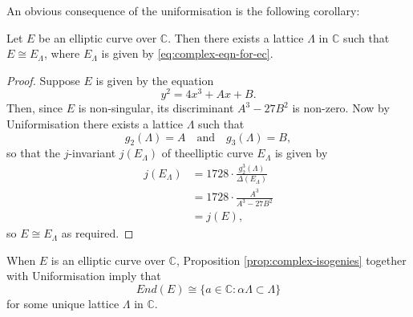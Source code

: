  An obvious consequence of the uniformisation is the following corollary:

 \begin{cor}
   \label{cor:uniformisation-corollary}
   Let $E$ be an elliptic curve over $\mathbb{C}$.  Then there exists a lattice
   $\Lambda$ in $\mathbb{C}$ such that $E \cong E_{\Lambda}$, where $E_{\Lambda}$ is
   given by \eqref{eq:complex-eqn-for-ec}.
 \end{cor}
 \begin{proof}
   Suppose $E$ is given by the equation
   \begin{equation*}
     y^{2} = 4x^{3} + Ax + B.
   \end{equation*}
   Then, since $E$ is non-singular, its discriminant $A^{3} - 27B^{2}$ is non-zero.
   Now by Uniformisation there exists a lattice $\Lambda$ such that
   \begin{equation*}
     g_{2}(\Lambda) = A \quad \text{and} \quad g_{3}(\Lambda) = B,
   \end{equation*}
   so that the $j$-invariant $j(E_{\Lambda})$ of theelliptic curve $E_{\Lambda}$ is
   given by
   \begin{align*}
     j(E_{\Lambda})&= 1728 \cdot \frac{g_{2}^{3}(\Lambda)}{\Delta(E_{\Lambda})}\\
     &=1728 \cdot \frac{A^{3}}{A^{3} - 27B^{2}}\\
     &=j(E),
   \end{align*}
   so $E \cong E_{\Lambda}$ as required.
 \end{proof}

 When $E$ is an elliptic curve over $\mathbb{C}$, Proposition
 \ref{prop:complex-isogenies} together with Uniformisation imply that
 \begin{equation}
   \label{eq:End(E)-in-complex}
   End(E) \cong \{a \in \mathbb{C} : \alpha \Lambda \subset \Lambda \}
 \end{equation}
 for some unique lattice $\Lambda$ in $\mathbb{C}$.

